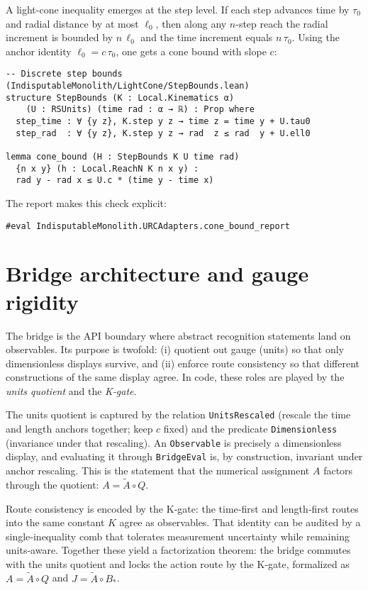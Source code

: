 \documentclass[11pt,a4paper,twoside]{article}
\numberwithin{equation}{section}
\newcommand{\Atilde}{\tilde{A}}
\newcommand{\Bstar}{B_*}
\theoremstyle{customthm}
\theoremstyle{customdef}
\theoremstyle{customrem}
\begin{document}
A light-cone inequality emerges at the step level. If each step advances time by $\tau_0$ and radial distance by at most $\ell_0$, then along any $n$-step reach the radial increment is bounded by $n\,\ell_0$ and the time increment equals $n\,\tau_0$. Using the anchor identity $\ell_0 = c\,\tau_0$, one gets a cone bound with slope $c$:

\begin{lstlisting}
-- Discrete step bounds (IndisputableMonolith/LightCone/StepBounds.lean)
structure StepBounds (K : Local.Kinematics α)
    (U : RSUnits) (time rad : α → ℝ) : Prop where
  step_time : ∀ {y z}, K.step y z → time z = time y + U.tau0
  step_rad  : ∀ {y z}, K.step y z → rad  z ≤ rad  y + U.ell0

lemma cone_bound (H : StepBounds K U time rad)
  {n x y} (h : Local.ReachN K n x y) :
  rad y - rad x ≤ U.c * (time y - time x)
\end{lstlisting}

The report makes this check explicit:

\begin{lstlisting}
#eval IndisputableMonolith.URCAdapters.cone_bound_report
\end{lstlisting}

\section{Bridge architecture and gauge rigidity}\label{sec:bridge}

The bridge is the API boundary where abstract recognition statements land on observables. Its purpose is twofold: (i) quotient out gauge (units) so that only dimensionless displays survive, and (ii) enforce route consistency so that different constructions of the same display agree. In code, these roles are played by the \emph{units quotient} and the \emph{K‐gate}.

The units quotient is captured by the relation \texttt{UnitsRescaled} (rescale the time and length anchors together; keep \(c\) fixed) and the predicate \texttt{Dimensionless} (invariance under that rescaling). An \texttt{Observable} is precisely a dimensionless display, and evaluating it through \texttt{BridgeEval} is, by construction, invariant under anchor rescaling. This is the statement that the numerical assignment \(A\) factors through the quotient: \(A = \Atilde \circ Q\).

Route consistency is encoded by the K‐gate: the time‐first and length‐first routes into the same constant \(K\) agree as observables. That identity can be audited by a single‐inequality comb that tolerates measurement uncertainty while remaining units‐aware. Together these yield a factorization theorem: the bridge commutes with the units quotient and locks the action route by the K‐gate, formalized as \(A = \Atilde \circ Q\) and \(J = \Atilde \circ \Bstar\).
\end{document}
